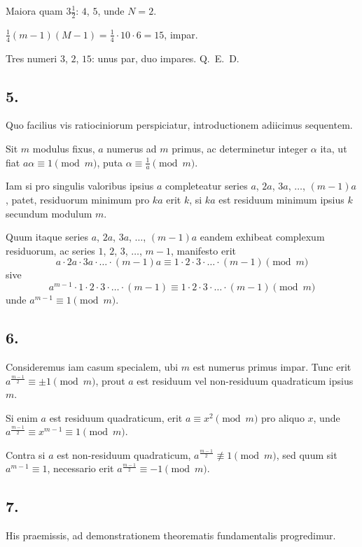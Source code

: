 \documentclass[12pt,a4paper]{article}
\theoremstyle{plain}
\theoremstyle{definition}
\theoremstyle{remark}
\begin{document}
Maiora quam $3\frac{1}{2}$: $4$, $5$, unde $N=2$.

$\frac{1}{4}(m-1)(M-1) = \frac{1}{4} \cdot 10 \cdot 6 = 15$, impar.

Tres numeri $3$, $2$, $15$: unus par, duo impares. \hfill Q.~E.~D.


\newpage
\subsection*{5.}
Quo facilius vis ratiociniorum perspiciatur, introductionem adiicimus sequentem.

Sit $m$ modulus fixus, $a$ numerus ad $m$ primus, ac determinetur integer $\alpha$ ita, ut fiat $a\alpha \equiv 1 \pmod{m}$, puta $\alpha \equiv \frac{1}{a} \pmod{m}$.

Iam si pro singulis valoribus ipsius $a$ completeatur series $a$, $2a$, $3a$, $\ldots$, $(m-1)a$, patet, residuorum minimum pro $ka$ erit $k$, si $ka$ est residuum minimum ipsius $k$ secundum modulum $m$.

Quum itaque series $a$, $2a$, $3a$, $\ldots$, $(m-1)a$ eandem exhibeat complexum residuorum, ac series $1$, $2$, $3$, $\ldots$, $m-1$, manifesto erit
\[a \cdot 2a \cdot 3a \cdot \ldots \cdot (m-1)a \equiv 1 \cdot 2 \cdot 3 \cdot \ldots \cdot (m-1) \pmod{m}\]
sive
\[a^{m-1} \cdot 1 \cdot 2 \cdot 3 \cdot \ldots \cdot (m-1) \equiv 1 \cdot 2 \cdot 3 \cdot \ldots \cdot (m-1) \pmod{m}\]
unde $a^{m-1} \equiv 1 \pmod{m}$.

\subsection*{6.}
Consideremus iam casum specialem, ubi $m$ est numerus primus impar. Tunc erit $a^{\frac{m-1}{2}} \equiv \pm 1 \pmod{m}$, prout $a$ est residuum vel non-residuum quadraticum ipsius $m$.

Si enim $a$ est residuum quadraticum, erit $a \equiv x^2 \pmod{m}$ pro aliquo $x$, unde $a^{\frac{m-1}{2}} \equiv x^{m-1} \equiv 1 \pmod{m}$.

Contra si $a$ est non-residuum quadraticum, $a^{\frac{m-1}{2}} \not\equiv 1 \pmod{m}$, sed quum sit $a^{m-1} \equiv 1$, necessario erit $a^{\frac{m-1}{2}} \equiv -1 \pmod{m}$.

\newpage
\subsection*{7.}
His praemissis, ad demonstrationem theorematis fundamentalis progredimur.
\end{document}

